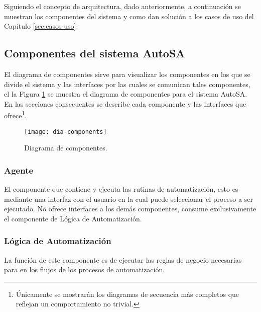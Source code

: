 Siguiendo el concepto de arquitectura, dado anteriormente, a continuación se muestran los componentes del sistema y como dan solución a los casos de uso del Capítulo \ref{sec:casos-uso}.

\subsection{Componentes del sistema AutoSA}
El diagrama de componentes sirve para visualizar los componentes en los que se divide el sistema y las interfaces por las cuales se comunican tales componentes, el la Figura \ref{fig:dia-components} se muestra el diagrama de componentes para el sistema AutoSA. En las secciones consecuentes se describe cada componente y las interfaces que ofrece\footnote{Únicamente se mostrarán los diagramas de secuencia más completos que reflejan un comportamiento no trivial.}.
\begin{figure}[h]
\centering
\texttt{[image: dia-components]}
\caption{Diagrama de componentes.}
\label{fig:dia-components}
\end{figure}

\subsubsection{Agente}
El componente que contiene y ejecuta las rutinas de automatización, esto es mediante una interfaz con el usuario en la cual puede seleccionar el proceso a ser ejecutado. No ofrece interfaces a los demás componentes, consume exclusivamente el componente de Lógica de Automatización.

\subsubsection{Lógica de Automatización}
La función de este componente es de ejecutar las reglas de negocio necesarias para en los flujos de los procesos de automatización.  
